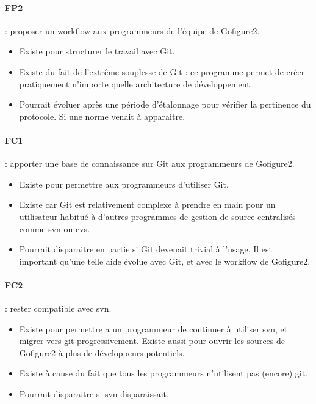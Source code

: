 \paragraph*{FP2} : proposer un workflow aux programmeurs de l'équipe de Gofigure2.
\begin{itemize}
  \item Existe pour structurer le travail avec Git.
  \item Existe du fait de l'extrême souplesse de Git : ce programme 
  permet de créer pratiquement n'importe quelle architecture de développement.
  \item Pourrait évoluer après une période d'étalonnage pour vérifier la pertinence du protocole.
  Si une norme venait à apparaitre.
\end{itemize}

\paragraph*{FC1} : apporter une base de connaissance sur Git aux programmeurs de Gofigure2.
\begin{itemize}
  \item Existe pour permettre aux programmeurs d'utiliser Git.
  \item Existe car Git est relativement complexe à prendre en main 
  pour un utilisateur habitué à d'autres programmes de gestion de source centralisés comme svn ou cvs.
  \item Pourrait disparaitre en partie si Git devenait trivial à l'usage.
  Il est important qu'une telle aide évolue avec Git, et avec le workflow de Gofigure2.
\end{itemize}

\paragraph*{FC2} : rester compatible avec svn.
\begin{itemize}
  \item Existe pour permettre a un programmeur de continuer à utiliser svn, et migrer vers git progressivement.
  Existe aussi pour ouvrir les sources de Gofigure2 à plus de développeurs potentiels.
  \item Existe à cause du fait que tous les programmeurs n'utilisent pas (encore) git.
  \item Pourrait disparaitre si svn disparaissait.
\end{itemize}


